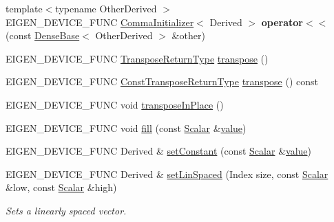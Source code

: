 \begin{DoxyCompactItemize}
\mbox{\label{class_eigen_1_1_dense_base_aff25a2d1fb50e69941e51457498c5744}} 
{\footnotesize template$<$typename Other\+Derived $>$ }\\E\+I\+G\+E\+N\+\_\+\+D\+E\+V\+I\+C\+E\+\_\+\+F\+U\+NC \mbox{\hyperlink{struct_eigen_1_1_comma_initializer}{Comma\+Initializer}}$<$ Derived $>$ {\bfseries operator$<$$<$} (const \mbox{\hyperlink{class_eigen_1_1_dense_base}{Dense\+Base}}$<$ Other\+Derived $>$ \&other)
\item 
E\+I\+G\+E\+N\+\_\+\+D\+E\+V\+I\+C\+E\+\_\+\+F\+U\+NC \mbox{\hyperlink{class_eigen_1_1_transpose}{Transpose\+Return\+Type}} \mbox{\hyperlink{class_eigen_1_1_dense_base_ac8952c19644a4ac7e41bea45c19b909c}{transpose}} ()
\item 
E\+I\+G\+E\+N\+\_\+\+D\+E\+V\+I\+C\+E\+\_\+\+F\+U\+NC \mbox{\hyperlink{class_eigen_1_1_transpose}{Const\+Transpose\+Return\+Type}} \mbox{\hyperlink{class_eigen_1_1_dense_base_a38c0b074cf93fc194bf91141287cee3f}{transpose}} () const
\item 
E\+I\+G\+E\+N\+\_\+\+D\+E\+V\+I\+C\+E\+\_\+\+F\+U\+NC void \mbox{\hyperlink{class_eigen_1_1_dense_base_ac501bd942994af7a95d95bee7a16ad2a}{transpose\+In\+Place}} ()
\item 
E\+I\+G\+E\+N\+\_\+\+D\+E\+V\+I\+C\+E\+\_\+\+F\+U\+NC void \mbox{\hyperlink{class_eigen_1_1_dense_base_a4f5eb49e80db57f79a8353ecdf811418}{fill}} (const \mbox{\hyperlink{class_eigen_1_1_dense_base_a5feed465b3a8e60c47e73ecce83e39a2}{Scalar}} \&\mbox{\hyperlink{class_eigen_1_1_dense_base_a8da735a6bfc7012606acf787156d10a0}{value}})
\item 
E\+I\+G\+E\+N\+\_\+\+D\+E\+V\+I\+C\+E\+\_\+\+F\+U\+NC Derived \& \mbox{\hyperlink{class_eigen_1_1_dense_base_a19b2bc788277e9ab3f967a8857e290ae}{set\+Constant}} (const \mbox{\hyperlink{class_eigen_1_1_dense_base_a5feed465b3a8e60c47e73ecce83e39a2}{Scalar}} \&\mbox{\hyperlink{class_eigen_1_1_dense_base_a8da735a6bfc7012606acf787156d10a0}{value}})
\item 
E\+I\+G\+E\+N\+\_\+\+D\+E\+V\+I\+C\+E\+\_\+\+F\+U\+NC Derived \& \mbox{\hyperlink{class_eigen_1_1_dense_base_a17a69cfd1b44b64f26b1a0f00666a871}{set\+Lin\+Spaced}} (Index size, const \mbox{\hyperlink{class_eigen_1_1_dense_base_a5feed465b3a8e60c47e73ecce83e39a2}{Scalar}} \&low, const \mbox{\hyperlink{class_eigen_1_1_dense_base_a5feed465b3a8e60c47e73ecce83e39a2}{Scalar}} \&high)
\begin{DoxyCompactList}\small\item\em Sets a linearly spaced vector. \end{DoxyCompactList}\item 

\end{DoxyCompactItemize}
